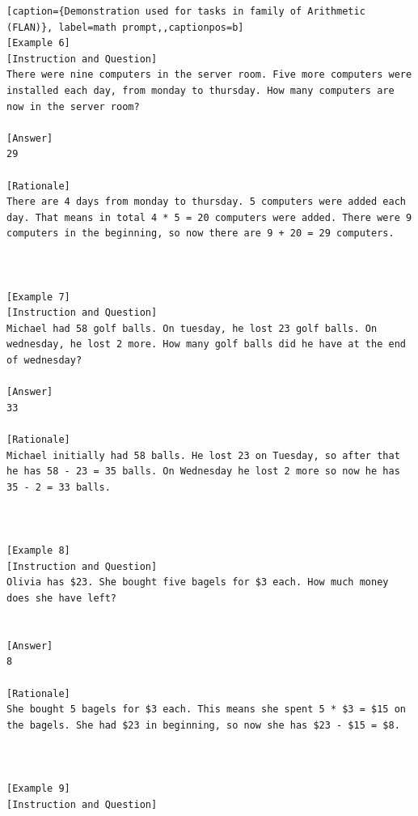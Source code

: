 \begin{lstlisting}[caption={Demonstration used for tasks in family of Arithmetic (FLAN)}, label=math prompt,,captionpos=b]
[Example 6]
[Instruction and Question] 
There were nine computers in the server room. Five more computers were installed each day, from monday to thursday. How many computers are now in the server room?

[Answer] 
29

[Rationale]
There are 4 days from monday to thursday. 5 computers were added each day. That means in total 4 * 5 = 20 computers were added. There were 9 computers in the beginning, so now there are 9 + 20 = 29 computers. 



[Example 7]
[Instruction and Question] 
Michael had 58 golf balls. On tuesday, he lost 23 golf balls. On wednesday, he lost 2 more. How many golf balls did he have at the end of wednesday?

[Answer] 
33

[Rationale]
Michael initially had 58 balls. He lost 23 on Tuesday, so after that he has 58 - 23 = 35 balls. On Wednesday he lost 2 more so now he has 35 - 2 = 33 balls. 



[Example 8]
[Instruction and Question] 
Olivia has $23. She bought five bagels for $3 each. How much money does she have left?


[Answer] 
8

[Rationale]
She bought 5 bagels for $3 each. This means she spent 5 * $3 = $15 on the bagels. She had $23 in beginning, so now she has $23 - $15 = $8. 



[Example 9]
[Instruction and Question]

    \end{lstlisting}
    